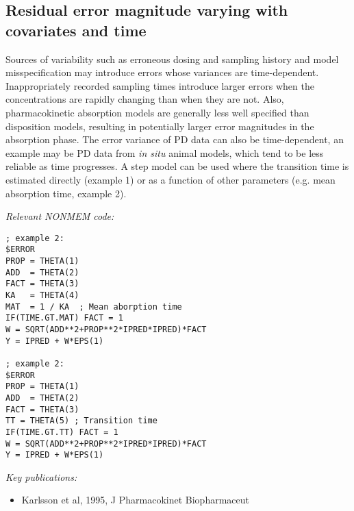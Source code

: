 \documentclass[a4paper,11pt]{article}
\begin{document}
\subsection{Residual error magnitude varying with covariates and time}

Sources of variability such as erroneous dosing and sampling history
and model misspecification may introduce errors whose variances are
time-dependent. Inappropriately recorded sampling times introduce
larger errors when the concentrations are rapidly changing than when
they are not. Also, pharmacokinetic absorption models are generally
less well specified than disposition models, resulting in potentially
larger error magnitudes in the absorption phase. The error variance of
PD data can also be time-dependent, an example may be PD data from
\textit{in situ} animal models, which tend to be less reliable as time
progresses. A step model can be used where the transition time is
estimated directly (example 1) or as a function of other parameters
(e.g. mean absorption time, example 2).

\vspace{10pt}

\noindent \emph{Relevant NONMEM code:}
\begin{lstlisting}
; example 2:
$ERROR
PROP = THETA(1)
ADD  = THETA(2)
FACT = THETA(3)
KA   = THETA(4)
MAT  = 1 / KA  ; Mean aborption time
IF(TIME.GT.MAT) FACT = 1
W = SQRT(ADD**2+PROP**2*IPRED*IPRED)*FACT
Y = IPRED + W*EPS(1)

; example 2:
$ERROR
PROP = THETA(1)
ADD  = THETA(2)
FACT = THETA(3)
TT = THETA(5) ; Transition time
IF(TIME.GT.TT) FACT = 1
W = SQRT(ADD**2+PROP**2*IPRED*IPRED)*FACT
Y = IPRED + W*EPS(1)
\end{lstlisting}

\noindent \emph{Key publications:}
\begin{itemize}
\item Karlsson et al, 1995, J Pharmacokinet Biopharmaceut
\end{itemize}
\end{document}
